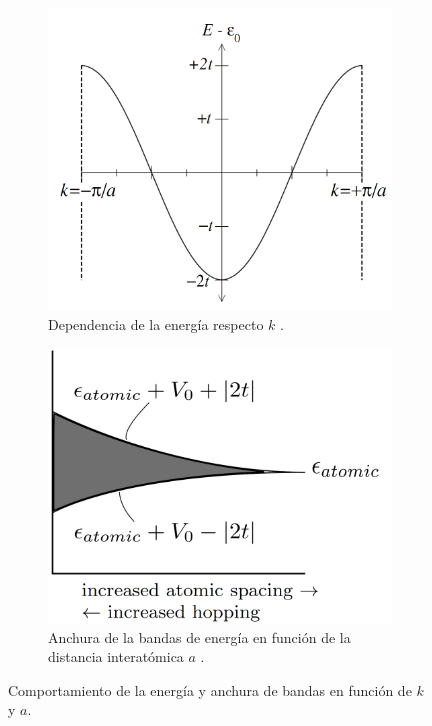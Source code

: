 \begin{figure}[h!]\centering
	\begin{subfigure}{0.46\linewidth} \centering
		\includegraphics[scale=0.35]{Cuerpo/Ch_07/Oxford-05.png}
		\caption{Dependencia de la energía respecto $k$ \cite{Oxford_Solid_State}.}
		\label{Fig:07-01-00}
	\end{subfigure}
	\begin{subfigure}{0.46\linewidth} \centering
		\includegraphics[scale=0.3]{Cuerpo/Ch_07/Oxford-06.png}
		\caption{Anchura de la bandas de energía en función de la distancia interatómica $a$ \cite{Oxford_Solid_State}.}
		\label{Fig:07-01-01}
	\end{subfigure}
	\caption{Comportamiento de la energía y anchura de bandas en función de $k$ y $a$.}
\end{figure}

